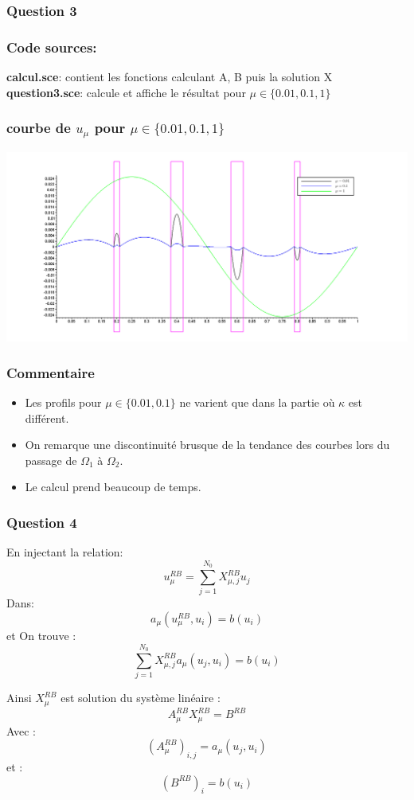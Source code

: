 \documentclass{article}
\newcommand{\Q}[1]{\subsubsection*{Question #1}}
\newcommand{\Code}[2]{\textbf{#1}: #2\\}
\newcommand{\Source}[0]{\subsubsection*{Code sources:}}
\begin{document}
\Q{3}

\Source
\Code{calcul.sce}{contient les fonctions calculant A, B puis la solution X}
\Code{question3.sce}{calcule et affiche le résultat pour $\mu \in \{0.01, 0.1, 1\}$}


\subsubsection*{courbe de $u_\mu$ pour $\mu \in \{0.01, 0.1, 1\}$}
\includegraphics[scale=0.25]{img/q3.png}



\subsubsection*{Commentaire}
\begin{itemize}
	\item Les profils pour $\mu \in \{0.01, 0.1\}$ ne varient que dans la partie où $\kappa$ est différent.
	\item On remarque une discontinuité brusque de la tendance des courbes lors du passage de $\Omega_1$ à $\Omega_2$.
	\item Le calcul prend beaucoup de temps.
\end{itemize}



\Q{4}
En injectant la relation:
$$ u_{\mu}^{RB} = \sum_{j=1}^{N_{0}} X_{\mu , j }^{RB} u_{j} $$ 
Dans:
$$ a_{\mu}( u_{\mu}^{RB} , u_{i} ) = b(u_{i}) $$ et 
On trouve : 
$$ \sum_{j=1}^{N_{0}} X_{\mu , j }^{RB} a_{\mu}(u_{j},u_{i}) = b(u_{i}) $$ 

Ainsi $ X_{\mu}^{RB} $ est solution du système linéaire : 
$$ A_{\mu}^{RB}X_{\mu}^{RB} = B^{RB} $$ 
Avec : 
$$ (A_{\mu}^{RB})_{i,j} = a_{\mu}(u_{j},u_{i}) $$
et : 
$$ (B^{RB})_{i} = b(u_{i}) $$
\end{document}
